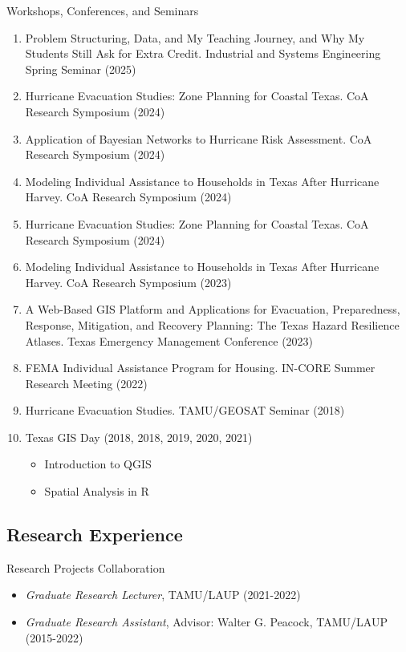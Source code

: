 \documentclass[11pt,oneside]{article}
\begin{document}
\vspace{3pt}

{Workshops, Conferences, and Seminars}
\begin{enumerate}[leftmargin=20pt]
\item Problem Structuring, Data, and My Teaching Journey, and Why My Students Still Ask for Extra Credit. Industrial and Systems Engineering Spring Seminar (2025)
\item Hurricane Evacuation Studies: Zone Planning for Coastal Texas. CoA Research Symposium (2024)
\item Application of Bayesian Networks to Hurricane Risk Assessment. CoA Research Symposium (2024)
\item Modeling Individual Assistance to Households ​in Texas After Hurricane Harvey. CoA Research Symposium (2024)
\item Hurricane Evacuation Studies: Zone Planning for Coastal Texas. CoA Research Symposium (2024)
\item Modeling Individual Assistance to Households ​in Texas After Hurricane Harvey. CoA Research Symposium (2023)
\item A Web-Based GIS Platform and Applications for Evacuation, Preparedness, Response, Mitigation, and Recovery Planning: The Texas Hazard Resilience Atlases. Texas Emergency Management Conference (2023)\\
\item FEMA Individual Assistance Program for Housing. IN-CORE Summer Research Meeting (2022)
\item Hurricane Evacuation Studies. TAMU/GEOSAT Seminar (2018)
\item Texas GIS Day (2018, 2018, 2019, 2020, 2021)\\
\begin{itemize}
\item Introduction to QGIS
\item Spatial Analysis in R
\end{itemize}
\end{enumerate}

\newpage

\subsection*{Research Experience}
{Research Projects Collaboration}
\begin{itemize}[leftmargin=20pt]
\item \emph{Graduate Research Lecturer}, TAMU/LAUP (2021-2022)
\item \emph{Graduate Research Assistant}, Advisor: Walter G. Peacock, TAMU/LAUP (2015-2022)
\end{itemize}
\end{document}
